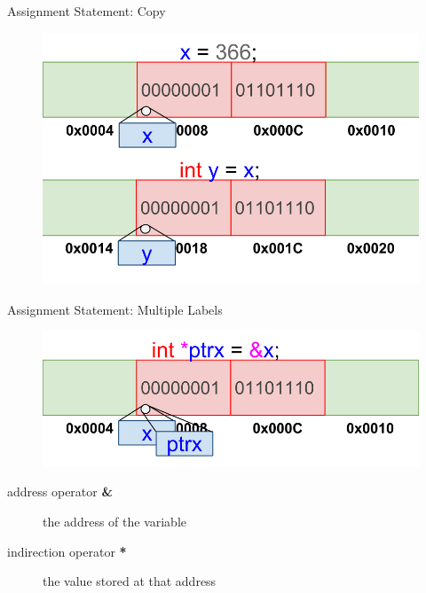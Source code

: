 \documentclass[xcolor={dvipsnames}]{beamer}
\begin{document}
\begin{frame}{Assignment Statement: Copy}
\begin{figure}
	\includegraphics[width=1\textwidth]{copy}
\end{figure}
\end{frame}

\begin{frame}{Assignment Statement: Multiple Labels}
\begin{figure}
	\includegraphics[width=1\textwidth]{ptr}
\end{figure}

\begin{block}{}
	\begin{description}
		\item[address operator \textbf{\&}] the address of the variable
		\item[indirection operator \textbf{*}] the value stored at that address		
	\end{description}
\end{block}
\end{frame}
\end{document}
